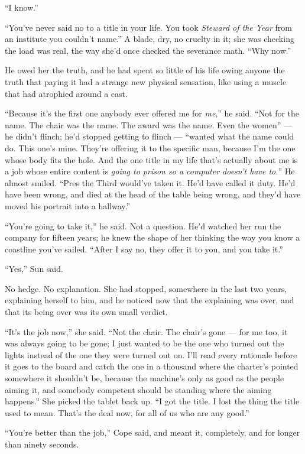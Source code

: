 \documentclass[11pt,openany]{book}
\begin{document}
``I know.''

``You've never said no to a title in your life. You took \textit{Steward of the Year} from an institute you couldn't name.'' A blade, dry, no cruelty in it; she was checking the load was real, the way she'd once checked the severance math. ``Why now.''

He owed her the truth, and he had spent so little of his life owing anyone the truth that paying it had a strange new physical sensation, like using a muscle that had atrophied around a cast.

``Because it's the first one anybody ever offered me for \textit{me},'' he said. ``Not for the name. The chair was the name. The award was the name. Even the women'' --- he didn't flinch; he'd stopped getting to flinch --- ``wanted what the name could do. This one's mine. They're offering it to the specific man, because I'm the one whose body fits the hole. And the one title in my life that's actually about me is a job whose entire content is \textit{going to prison so a computer doesn't have to.}'' He almost smiled. ``Pres the Third would've taken it. He'd have called it duty. He'd have been wrong, and died at the head of the table being wrong, and they'd have moved his portrait into a hallway.''

``You're going to take it,'' he said. Not a question. He'd watched her run the company for fifteen years; he knew the shape of her thinking the way you know a coastline you've sailed. ``After I say no, they offer it to you, and you take it.''

``Yes,'' Sun said.

No hedge. No explanation. She had stopped, somewhere in the last two years, explaining herself to him, and he noticed now that the explaining was over, and that its being over was its own small verdict.

``It's the job now,'' she said. ``Not the chair. The chair's gone --- for me too, it was always going to be gone; I just wanted to be the one who turned out the lights instead of the one they were turned out on. I'll read every rationale before it goes to the board and catch the one in a thousand where the charter's pointed somewhere it shouldn't be, because the machine's only as good as the people aiming it, and somebody competent should be standing where the aiming happens.'' She picked the tablet back up. ``I got the title. I lost the thing the title used to mean. That's the deal now, for all of us who are any good.''

``You're better than the job,'' Cope said, and meant it, completely, and for longer than ninety seconds.
\end{document}
